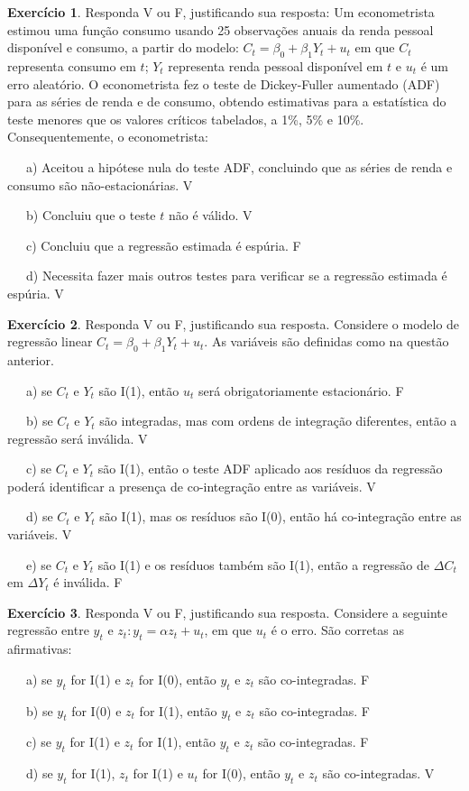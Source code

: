 \documentclass[
]{book}
\theoremstyle{definition}
\theoremstyle{definition}
\theoremstyle{definition}
\newtheorem{exercise}{Exercício}[chapter]
\theoremstyle{remark}
\begin{document}
\begin{exercise}
\protect\hypertarget{exr:exervf2}{}{\label{exr:exervf2} }Responda V ou F, justificando sua resposta: Um econometrista estimou uma função consumo usando 25 observações anuais da renda pessoal disponível e consumo, a partir do modelo: \(C_t = \beta_0 +\beta_1 Y_t +u_t\) em que \(C_t\) representa consumo em \(t\); \(Y_t\) representa renda pessoal disponível em \(t\) e \(u_t\) é um erro aleatório. O econometrista fez o teste de Dickey-Fuller aumentado (ADF) para as séries de renda e de consumo, obtendo estimativas
para a estatística do teste menores que os valores críticos tabelados, a 1\%, 5\% e 10\%. Consequentemente, o econometrista:

~~~a) Aceitou a hipótese nula do teste ADF, concluindo que as séries de renda e consumo são não-estacionárias. V

~~~b) Concluiu que o teste \(t\) não é válido. V

~~~c) Concluiu que a regressão estimada é espúria. F

~~~d) Necessita fazer mais outros testes para verificar se a regressão estimada é espúria. V
\end{exercise}

\begin{exercise}
\protect\hypertarget{exr:exervf3}{}{\label{exr:exervf3} }Responda V ou F, justificando sua resposta. Considere o modelo de regressão linear \(C_t = \beta_0 + \beta_1Y_t + u_t\). As variáveis são definidas como na questão anterior.

~~~a) se \(C_t\) e \(Y_t\) são I(1), então \(u_t\) será obrigatoriamente estacionário. F

~~~b) se \(C_t\) e \(Y_t\) são integradas, mas com ordens de integração diferentes, então a regressão será inválida. V

~~~c) se \(C_t\) e \(Y_t\) são I(1), então o teste ADF aplicado aos resíduos da regressão poderá identificar a presença de co-integração entre as variáveis. V

~~~d) se \(C_t\) e \(Y_t\) são I(1), mas os resíduos são I(0), então há co-integração entre as variáveis. V

~~~e) se \(C_t\) e \(Y_t\) são I(1) e os resíduos também são I(1), então a regressão de \(\Delta C_t\) em \(\Delta Y_t\) é inválida. F
\end{exercise}

\begin{exercise}
\protect\hypertarget{exr:exervf4}{}{\label{exr:exervf4} }Responda V ou F, justificando sua resposta. Considere a seguinte regressão entre \(y_t\) e \(z_t: y_t = \alpha z_t + u_t\), em que \(u_t\) é o erro. São corretas as afirmativas:

~~~a) se \(y_t\) for I(1) e \(z_t\) for I(0), então \(y_t\) e \(z_t\) são co-integradas. F

~~~b) se \(y_t\) for I(0) e \(z_t\) for I(1), então \(y_t\) e \(z_t\) são co-integradas. F

~~~c) se \(y_t\) for I(1) e \(z_t\) for I(1), então \(y_t\) e \(z_t\) são co-integradas. F

~~~d) se \(y_t\) for I(1), \(z_t\) for I(1) e \(u_t\) for I(0), então \(y_t\) e \(z_t\) são co-integradas. V
\end{exercise}
\end{document}
